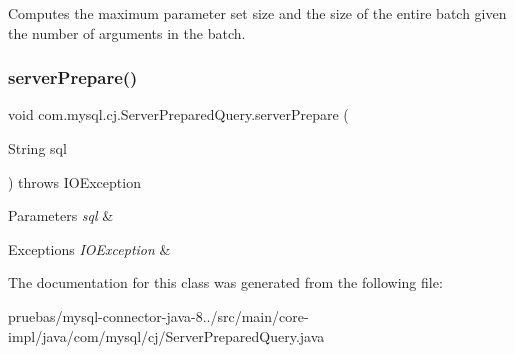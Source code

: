 Computes the maximum parameter set size and the size of the entire batch given the number of arguments in the batch. \mbox{\label{classcom_1_1mysql_1_1cj_1_1_server_prepared_query_abfccd6509abf393d67f2ba609867edea}} 
\subsubsection{\texorpdfstring{server\+Prepare()}{serverPrepare()}}
{\footnotesize\ttfamily void com.\+mysql.\+cj.\+Server\+Prepared\+Query.\+server\+Prepare (\begin{DoxyParamCaption}\item[{String}]{sql }\end{DoxyParamCaption}) throws I\+O\+Exception}


\begin{DoxyParams}{Parameters}
{\em sql} & \\
\hline
\end{DoxyParams}

\begin{DoxyExceptions}{Exceptions}
{\em I\+O\+Exception} & \\
\hline
\end{DoxyExceptions}


The documentation for this class was generated from the following file\+:\begin{DoxyCompactItemize}
\item 
pruebas/mysql-\/connector-\/java-\/8../src/main/core-\/impl/java/com/mysql/cj/Server\+Prepared\+Query.\+java\end{DoxyCompactItemize}
